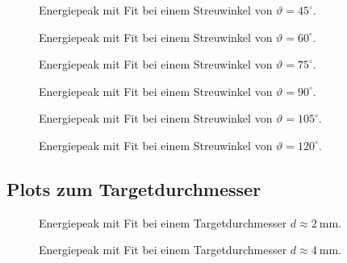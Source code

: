 \documentclass[slug=CS, room=Andreas-Schubert-Bau\,\ Labor\ 406,
supervisor=Juliane\ Volkmer, coursedate=29.\ 11.\ 2019]{../../Lab_Report_LaTeX/lab_report}
\begin{document}
\begin{figure}[H]\centering
  
  \caption{Energiepeak mit Fit bei einem Streuwinkel von \(\vartheta = 45^\circ\).}
  \label{fig:45}
\end{figure}

\begin{figure}[H]\centering
  
  \caption{Energiepeak mit Fit bei einem Streuwinkel von \(\vartheta = 60^\circ\).}
  \label{fig:60}
\end{figure}

\begin{figure}[H]\centering
  
  \caption{Energiepeak mit Fit bei einem Streuwinkel von \(\vartheta = 75^\circ\).}
  \label{fig:75}
\end{figure}

\begin{figure}[H]\centering
  
  \caption{Energiepeak mit Fit bei einem Streuwinkel von \(\vartheta = 90^\circ\).}
  \label{fig:90}
\end{figure}

\begin{figure}[H]\centering
  
  \caption{Energiepeak mit Fit bei einem Streuwinkel von \(\vartheta = 105^\circ\).}
  \label{fig:105}
\end{figure}

\begin{figure}[H]\centering
  
  \caption{Energiepeak mit Fit bei einem Streuwinkel von \(\vartheta = 120^\circ\).}
  \label{fig:120}
\end{figure}

\subsection{Plots zum Targetdurchmesser}
\label{sec:andiplot}

\begin{figure}[H]\centering
  
  \caption{Energiepeak mit Fit bei einem Targetdurchmesser \(d \approx \SI{2}{\milli\metre}\).}
  \label{fig:dicke-2}
\end{figure}

\begin{figure}[H]\centering
  
  \caption{Energiepeak mit Fit bei einem Targetdurchmesser \(d \approx \SI{4}{\milli\metre}\).}
  \label{fig:dicke-4}
\end{figure}
\end{document}
